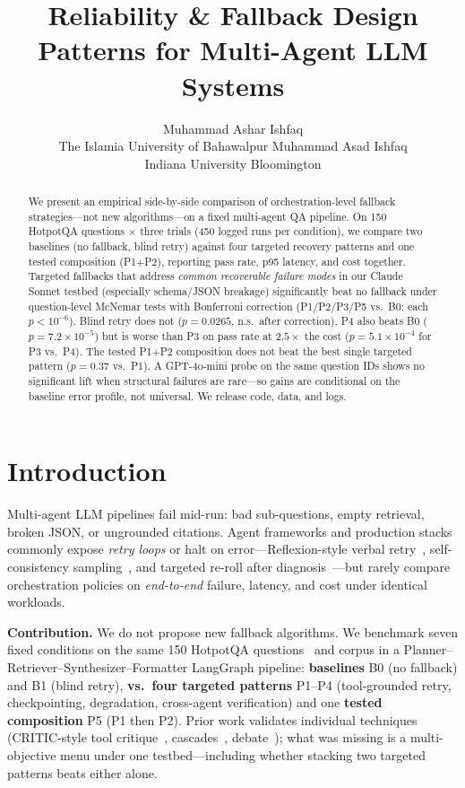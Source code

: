 \documentclass{article}
\title{Reliability \& Fallback Design Patterns for Multi-Agent LLM Systems}
\author{%
  Muhammad Ashar Ishfaq \\
  The Islamia University of Bahawalpur
  \And
  Muhammad Asad Ishfaq \\
  Indiana University Bloomington
}
\begin{document}
\maketitle

\begin{abstract}
We present an empirical side-by-side comparison of orchestration-level fallback strategies---not new algorithms---on a fixed multi-agent QA pipeline. On 150 HotpotQA questions $\times$ three trials (450 logged runs per condition), we compare two baselines (no fallback, blind retry) against four targeted recovery patterns and one tested composition (P1$+$P2), reporting pass rate, p95 latency, and cost together. Targeted fallbacks that address \emph{common recoverable failure modes} in our Claude Sonnet testbed (especially schema/JSON breakage) significantly beat no fallback under question-level McNemar tests with Bonferroni correction (P1/P2/P3/P5 vs.\ B0: each $p < 10^{-6}$). Blind retry does not ($p{=}0.0265$, n.s.\ after correction). P4 also beats B0 ($p{=}7.2\times 10^{-5}$) but is worse than P3 on pass rate at $2.5\times$ the cost ($p{=}5.1\times 10^{-4}$ for P3 vs.\ P4). The tested P1$+$P2 composition does not beat the best single targeted pattern ($p{=}0.37$ vs.\ P1). A GPT-4o-mini probe on the same question IDs shows no significant lift when structural failures are rare---so gains are conditional on the baseline error profile, not universal. We release code, data, and logs.
\end{abstract}

\section{Introduction}
\label{sec:intro}

Multi-agent LLM pipelines fail mid-run: bad sub-questions, empty retrieval, broken JSON, or ungrounded citations. Agent frameworks and production stacks commonly expose \emph{retry loops} or halt on error---Reflexion-style verbal retry~\citep{shinn2023reflexion}, self-consistency sampling~\citep{wang2023selfconsistency}, and targeted re-roll after diagnosis~\citep{zhu2025agentdebug}---but rarely compare orchestration policies on \emph{end-to-end} failure, latency, and cost under identical workloads.

\textbf{Contribution.} We do not propose new fallback algorithms. We benchmark seven fixed conditions on the same 150 HotpotQA questions~\citep{yang2018hotpotqa} and corpus in a Planner--Retriever--Synthesizer--Formatter LangGraph pipeline: \textbf{baselines} B0 (no fallback) and B1 (blind retry), \textbf{vs.\ four targeted patterns} P1--P4 (tool-grounded retry, checkpointing, degradation, cross-agent verification) and one \textbf{tested composition} P5 (P1 then P2). Prior work validates individual techniques (CRITIC-style tool critique~\citep{gou2024critic}, cascades~\citep{chen2024frugalgpt}, debate~\citep{du2024debate}); what was missing is a multi-objective menu under one testbed---including whether stacking two targeted patterns beats either alone.
\end{document}
